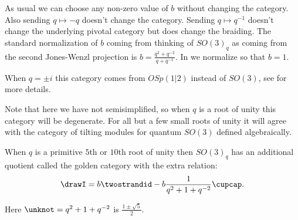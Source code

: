 \documentclass[12pt]{amsart}
\begin{document}
As usual we can choose any non-zero value of $b$ without changing the category.  Also sending $q \mapsto -q$ doesn't change the category.  Sending $q \mapsto q^{-1}$ doesn't change the underlying pivotal category but does change the braiding.  The standard normalization of $b$ coming from thinking of $SO(3)_q$ as coming from the second Jones-Wenzl projection is $b = \frac{q^2+q^{-2}}{q+q^{-1}}$. In \cite{MR3624901} we normalize so that $b=1$.

When $q=\pm i$ this category comes from $OSp(1|2)$ instead of $SO(3)$, see \cite{MR3624901} for more details.

Note that here we have not semisimplified, so when $q$ is a root of unity this category will be degenerate.  For all but a few small roots of unity it will agree with the category of tilting modules for quantum $SO(3)$ defined algebraically. \cite{???}

\begin{definition}
When $q$ is a primitive $5$th or $10$th root of unity then $SO(3)_q$ has an additional quotient called the golden category with the extra relation:
$$\drawI = b \twostrandid - b \frac{1}{q^2+1+q^{-2}} \cupcap.$$

Here $\unknot = q^2+1+q^{-2}$ is $\frac{1\pm \sqrt{5}}{2}$.
\end{definition}
\end{document}
